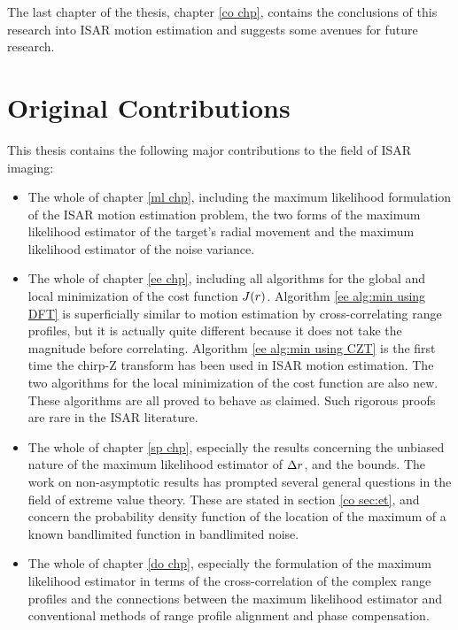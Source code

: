 The last chapter of the thesis, chapter \ref{co chp}, contains the 
conclusions of this research into ISAR motion estimation and
suggests some avenues for future research.


\section{Original Contributions}

This thesis contains the following major contributions to the field of ISAR
imaging:
\begin{itemize}
\item The whole of chapter \ref{ml chp}, including the maximum likelihood
formulation of the ISAR motion estimation problem, the two forms of the
maximum likelihood estimator of the target's radial movement and the maximum
likelihood estimator of the noise variance.

\item The whole of chapter \ref{ee chp}, including all algorithms for the
global and local minimization of the cost function $J({r})$.  Algorithm
\ref{ee alg:min using DFT} is superficially similar to motion estimation by
cross-correlating range profiles, but it is actually quite different because
it does not take the magnitude before correlating.  Algorithm \ref{ee
alg:min using CZT} is the first time the chirp-Z transform has been used in
ISAR motion estimation.  The two algorithms for the local minimization of
the cost function are also new.  These algorithms are all proved to behave as
claimed.  Such rigorous proofs are rare in the ISAR literature.

\item The whole of chapter \ref{sp chp}, especially the results concerning
the unbiased nature of the maximum likelihood estimator of ${\Delta r}$, and the
\CR bounds.  The work on non-asymptotic results has prompted several general
questions in the field of extreme value theory.  These are stated in section
\ref{co sec:et}, and concern the probability density function of the location of the
maximum of a known bandlimited function in bandlimited noise.

\item The whole of chapter \ref{do chp}, especially the formulation of the
maximum likelihood estimator in terms of the cross-correlation of the
complex range profiles and the connections between the maximum likelihood
estimator and conventional methods of range profile alignment and phase
compensation.


\end{itemize}
